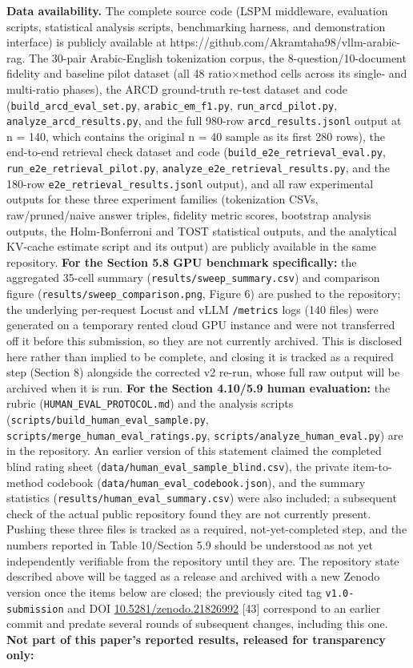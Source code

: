 \textbf{Data availability.} The complete source code (LSPM middleware, evaluation scripts, statistical analysis scripts, benchmarking harness, and demonstration interface) is publicly available at https://github.com/Akramtaha98/vllm-arabic-rag. The 30-pair Arabic-English tokenization corpus, the 8-question/10-document fidelity and baseline pilot dataset (all 48 ratio$\times$method cells across its single- and multi-ratio phases), the ARCD ground-truth re-test dataset and code (\texttt{build\_arcd\_eval\_set.py}, \texttt{arabic\_em\_f1.py}, \texttt{run\_arcd\_pilot.py}, \texttt{analyze\_arcd\_results.py}, and the full 980-row \texttt{arcd\_results.jsonl} output at n = 140, which contains the original n = 40 sample as its first 280 rows), the end-to-end retrieval check dataset and code (\texttt{build\_e2e\_retrieval\_eval.py}, \texttt{run\_e2e\_retrieval\_pilot.py}, \texttt{analyze\_e2e\_retrieval\_results.py}, and the 180-row \texttt{e2e\_retrieval\_results.jsonl} output), and all raw experimental outputs for these three experiment families (tokenization CSVs, raw/pruned/naive answer triples, fidelity metric scores, bootstrap analysis outputs, the Holm-Bonferroni and TOST statistical outputs, and the analytical KV-cache estimate script and its output) are publicly available in the same repository. \textbf{For the Section 5.8 GPU benchmark specifically:} the aggregated 35-cell summary (\texttt{results/sweep\_summary.csv}) and comparison figure (\texttt{results/sweep\_comparison.png}, Figure 6) are pushed to the repository; the underlying per-request Locust and vLLM \texttt{/metrics} logs (140 files) were generated on a temporary rented cloud GPU instance and were not transferred off it before this submission, so they are not currently archived. This is disclosed here rather than implied to be complete, and closing it is tracked as a required step (Section 8) alongside the corrected v2 re-run, whose full raw output will be archived when it is run. \textbf{For the Section 4.10/5.9 human evaluation:} the rubric (\texttt{HUMAN\_EVAL\_PROTOCOL.md}) and the analysis scripts (\texttt{scripts/build\_human\_eval\_sample.py}, \texttt{scripts/merge\_human\_eval\_ratings.py}, \texttt{scripts/analyze\_human\_eval.py}) are in the repository. An earlier version of this statement claimed the completed blind rating sheet (\texttt{data/human\_eval\_sample\_blind.csv}), the private item-to-method codebook (\texttt{data/human\_eval\_codebook.json}), and the summary statistics (\texttt{results/human\_eval\_summary.csv}) were also included; a subsequent check of the actual public repository found they are not currently present. Pushing these three files is tracked as a required, not-yet-completed step, and the numbers reported in Table 10/Section 5.9 should be understood as not yet independently verifiable from the repository until they are. The repository state described above will be tagged as a release and archived with a new Zenodo version once the items below are closed; the previously cited tag \texttt{v1.0-submission} and DOI \href{https://doi.org/10.5281/zenodo.21826992}{10.5281/zenodo.21826992} [43] correspond to an earlier commit and predate several rounds of subsequent changes, including this one. \textbf{Not part of this paper's reported results, released for transparency only:} 